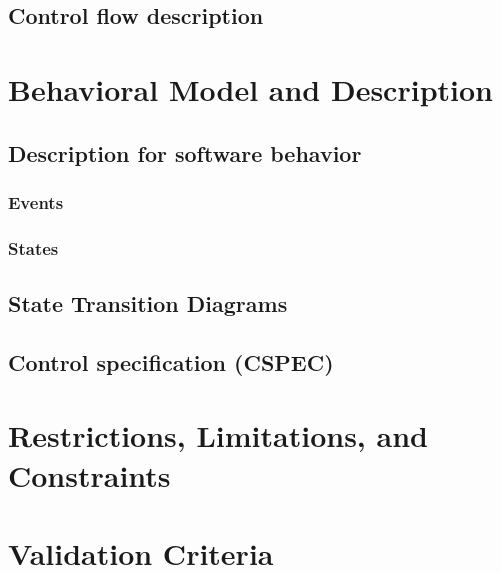 \documentclass{article}
\begin{document}
\subsection{Control flow description}

\section{ Behavioral Model and Description}

\subsection{Description for software behavior}

\subsubsection{Events}

\subsubsection{States}

\subsection{State Transition Diagrams}

\subsection{Control specification (CSPEC)}

\section{Restrictions, Limitations, and Constraints}

\section{Validation Criteria}
\end{document}

